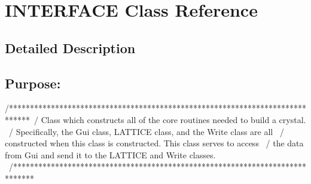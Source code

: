 \hypertarget{class_i_n_t_e_r_f_a_c_e}{}\section{I\+N\+T\+E\+R\+F\+A\+C\+E Class Reference}
\label{class_i_n_t_e_r_f_a_c_e}


\subsection{Detailed Description}
\subsection*{{\bfseries Purpose\+:} }

\begin{DoxyVerb}/*****************************************************************************\
/  Class which constructs all of the core routines needed to build a crystal. \
/  Specifically, the Gui class, LATTICE class, and the Write class are all    \
/  constructed when this class is constructed.  This class serves to access   \
/  the data from Gui and send it to the LATTICE and Write classes.            \
/*****************************************************************************\
\end{DoxyVerb}


